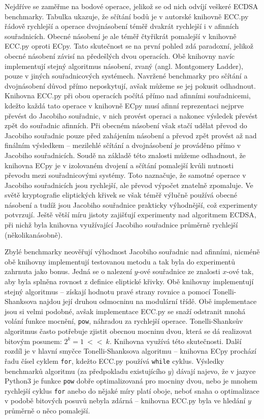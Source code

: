 \documentclass{article}
\theoremstyle{definition}
\begin{document}
Nejdříve se zaměřme na bodové operace, jelikož se od nich odvíjí veškeré ECDSA benchmarky. Tabulka ukazuje, že sčítání bodů je v autorské knihovně ECC.py řádově rychlejší a operace dvojnásobení téměř dvakrát rychlejší i v afinních souřadnicích. Obecné násobení je ale téměř čtyřikrát pomalejší v knihovně ECC.py oproti ECpy. Tato skutečnost se na první pohled zdá paradoxní, jelikož obecné násobení závisí na předešlých dvou operacích. Obě knihovny navíc implementují stejný algoritmus násobení, zvaný  (angl. Montgomery Ladder), pouze v jiných souřadnicových systémech. Navržené benchmarky pro sčítání a dvojnásobení důvod přímo neposkytují, avšak můžeme se jej pokusit odhadnout. Knihovna ECC.py při obou operacích počítá přímo nad afinními souřadnicemi, kdežto každá tato operace v knihovně ECpy musí afinní reprezentaci nejprve převést do Jacobiho souřadnic, v nich provést operaci a nakonec výsledek převést zpět do souřadnic afinních. Při obecném násobení však stačí udělat převod do Jacobiho souřadnic pouze před zahájením násobení a převod zpět provést až nad finálním výsledkem -- mezilehlé sčítání a dvojnásobení je prováděno přímo v Jacobiho souřadnicích. Soudě na základě této znalosti můžeme odhadnout, že knihovna ECpy je v izolovaném dvojení a sčítání pomalejší kvůli nutnosti převodu mezi souřadnicovými systémy. Toto naznačuje, že samotné operace v Jacobiho souřadnicích jsou rychlejší, ale převod výpočet znatelně zpomaluje. Ve světě kryptografie eliptických křivek se však téměř výlučně používá obecné násobení a tudíž jsou Jacobiho souřadnice prakticky výhodnější, což experimenty potvrzují. Ještě větší míru jistoty zajišťují experimenty nad algoritmem ECDSA, při nichž byla knihovna využívající Jacobiho souřadnice průměrně rychlejší (několikanásobně).

Zbylé benchmarky neověřují výhodnost Jacobiho souřadnic nad afinními, nicméně obě knihovny implementují testovanou metodu a tak byla do experimentů zahrnuta jako bonus. Jedná se o nalezení $y$-ové souřadnice ze znalosti $x$-ové tak, aby byla splněna rovnost z definice eliptické křivky. Obě knihovny implementují stejný algoritmus -- získají hodnotu pravé strany rovnice a pomocí Tonelli-Shanksova najdou její druhou odmocninu na modulární třídě. Obě implementace jsou si velmi podobné, avšak implementace ECC.py se snaží odstranit mnohá volání funkce mocnění, \verb|pow|, náhradou za rychlejší operace. Tonelli-Shanksův algoritmus často potřebuje zjistit obecnou mocninu dvou, která se dá realizovat bitovým posunem: $2^k = 1~<<~k$. Knihovna využívá této skutečnosti. Další rozdíl je v hlavní smyčce Tonelli-Shanksova algoritmu -- knihovna ECpy prochází řadu čísel cyklem \verb|for|, kdežto ECC.py používá \verb|while| cyklus. Výsledky benchmarků algoritmu (za předpokladu existujícího $y$) dávají najevo, že v jazyce Python3 je funkce \verb|pow| dobře optimalizovaná pro mocniny dvou, nebo je mnohem rychlejší cyklus \verb|for| anebo do nějaké míry platí oboje, neboť snaha o optimalizace v podobě bitových posuvů nebyla zdárná -- knihovna ECC.py byla ve hledání $y$ průměrně o něco pomalejší. 
\end{document}
